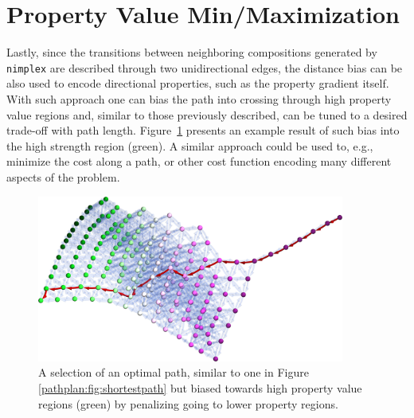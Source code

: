 \section{Property Value Min/Maximization} \label{pathplan:sec:minmax}

Lastly, since the transitions between neighboring compositions generated by \texttt{nimplex} are described through two unidirectional edges, the distance bias can be also used to encode directional properties, such as the property gradient itself. With such approach one can bias the path into crossing through high property value regions and, similar to those previously described, can be tuned to a desired trade-off with path length. Figure~\ref{pathplan:fig:highrmsad} presents an example result of such bias into the high strength region (green). A similar approach could be used to, e.g., minimize the cost along a path, or other cost function encoding many different aspects of the problem.

\begin{figure}[H]
    \centering
    \includegraphics[width=0.9\textwidth]{pathplanning/InfeasibilityGliding_HighRMSAD.png}
    \caption{A selection of an optimal path, similar to one in Figure \ref{pathplan:fig:shortestpath} but biased towards high property value regions (green) by penalizing going to lower property regions.}
    \label{pathplan:fig:highrmsad}
\end{figure}


\printbibliography[heading=subbibintoc]